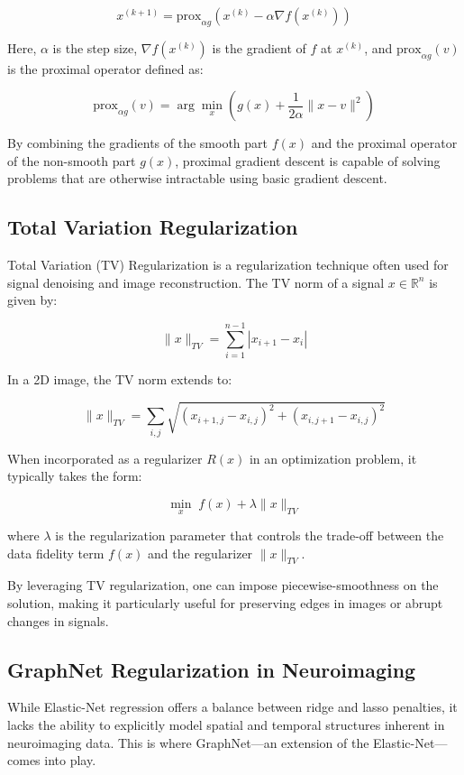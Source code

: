 \[
    x^{(k+1)} = \text{prox}_{\alpha g} \left( x^{(k)} - \alpha \nabla f(x^{(k)}) \right)
\]

Here, \( \alpha \) is the step size, \( \nabla f(x^{(k)}) \) is the gradient of \( f \) at \( x^{(k)} \), and \( \text{prox}_{\alpha g}(v) \) is the proximal operator defined as:

\[
    \text{prox}_{\alpha g}(v) = \arg\min_{x} \left( g(x) + \frac{1}{2\alpha} \| x - v \|^2 \right)
\]

By combining the gradients of the smooth part \( f(x) \) and the proximal operator of the non-smooth part \( g(x) \), proximal gradient descent is capable of solving problems that are otherwise intractable using basic gradient descent.

\subsection{Total Variation Regularization}

Total Variation (TV) Regularization is a regularization technique often used for signal denoising and image reconstruction. The TV norm of a signal \( x \in \mathbb{R}^n \) is given by:

\[
    \| x \|_{TV} = \sum_{i=1}^{n-1} |x_{i+1} - x_i|
\]

In a 2D image, the TV norm extends to:

\[
    \| x \|_{TV} = \sum_{i,j} \sqrt{(x_{i+1,j} - x_{i,j})^2 + (x_{i,j+1} - x_{i,j})^2}
\]

When incorporated as a regularizer \( R(x) \) in an optimization problem, it typically takes the form:

\[
    \min_{x} \; f(x) + \lambda \| x \|_{TV}
\]

where \( \lambda \) is the regularization parameter that controls the trade-off between the data fidelity term \( f(x) \) and the regularizer \( \| x \|_{TV} \).

By leveraging TV regularization, one can impose piecewise-smoothness on the solution, making it particularly useful for preserving edges in images or abrupt changes in signals.

\subsection{GraphNet Regularization in Neuroimaging}

While Elastic-Net regression offers a balance between ridge and lasso penalties, it lacks the ability to explicitly model spatial and temporal structures inherent in neuroimaging data.
This is where GraphNet—an extension of the Elastic-Net—comes into play.

